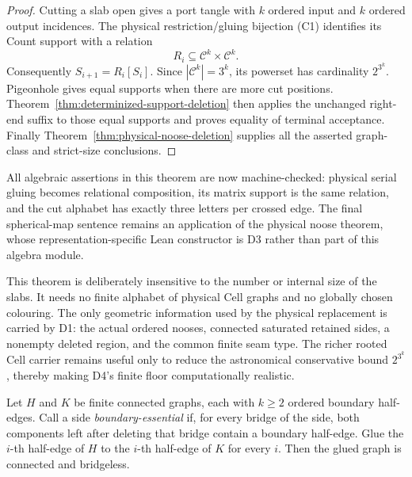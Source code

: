 \begin{proof}
Cutting a slab open gives a port tangle with \(k\) ordered input and \(k\)
ordered output incidences.  The physical restriction/gluing bijection (C1)
identifies its Count support with a relation
\[
                         R_i\subseteq\mathcal C^k\times\mathcal C^k.
\]
Consequently \(S_{i+1}=R_i[S_i]\).  Since
\(|\mathcal C^k|=3^k\), its powerset has cardinality \(2^{3^k}\).
Pigeonhole gives equal supports when there are more cut positions.
Theorem~\ref{thm:determinized-support-deletion} then applies the unchanged
right-end suffix to those equal supports and proves equality of terminal
acceptance.  Finally Theorem~\ref{thm:physical-noose-deletion} supplies all
the asserted graph-class and strict-size conclusions.
\end{proof}

All algebraic assertions in this theorem are now machine-checked: physical
serial gluing becomes relational composition, its matrix support is the same
relation, and the cut alphabet has exactly three letters per crossed edge.
The final spherical-map sentence remains an application of the physical
noose theorem, whose representation-specific Lean constructor is D3 rather
than part of this algebra module.

This theorem is deliberately insensitive to the number or internal size of
the slabs.  It needs no finite alphabet of physical Cell graphs and no
globally chosen colouring.  The only geometric information used by the
physical replacement is carried by D1: the actual ordered nooses, connected
saturated retained sides, a nonempty deleted region, and the common finite
seam type.  The richer rooted Cell carrier remains useful only to reduce the
astronomical conservative bound \(2^{3^k}\), thereby making D4's finite
floor computationally realistic.

\begin{lemma}
\label{lem:boundary-essential-gluing}
Let \(H\) and \(K\) be finite connected graphs, each with \(k\ge2\) ordered
boundary half-edges.  Call a side \emph{boundary-essential} if, for every
bridge of the side, both components left after deleting that bridge contain
a boundary half-edge.  Glue the \(i\)-th half-edge of \(H\) to the \(i\)-th
half-edge of \(K\) for every \(i\).  Then the glued graph is connected and
bridgeless.
\end{lemma}

